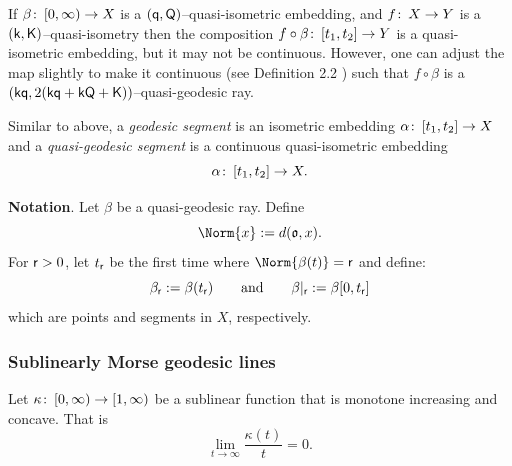 \documentclass[12 pt]{amsart}
\newcommand{\bfa}{\textbf{a}}
\newcommand{\bfb}{\textbf{b}}
\newcommand{\gothic}{\mathfrak}
\newcommand{\go}{{\gothic o}}
\theoremstyle{definition}
\theoremstyle{remark}
\newcommand{\sK}{{\sf K}}
\newcommand{\sQ}{{\sf Q}}
\renewcommand{\bfa}{{\sf a}}
\newcommand{\kk}{{\sf k}}
\newcommand{\qq}{{\sf q}}
\newcommand{\rr}{{\sf r}}
\newcommand{\from}{\colon\thinspace}
\begin{document}
If $\beta \from [0,\infty) \to X$ is a $(\qq, \sQ)$--quasi-isometric embedding, 
and $f \from X \to Y$ is a $(\kk, \sK)$--quasi-isometry then the composition 
$f \circ \beta \from [t_{1}, t_{2}] \to Y$ is a quasi-isometric embedding, but it may 
not be continuous. However, one can adjust the map slightly to make it continuous 
(see Definition 2.2  \cite{QRT1}) such that $f \circ \beta$ is a $(\kk\qq, 2(\kk\qq + \kk \sQ + \sK))$--quasi-geodesic ray.  

Similar to above, a \emph{geodesic segment} is an isometric embedding 
$\alpha \from [t_{1}, t_{2}] \to X$ and a \emph{quasi-geodesic segment} is a continuous 
quasi-isometric embedding \[\alpha \from [t_{1}, t_{2}] \to X.\] 

\noindent \textbf{Notation}. 
Let $\beta$ be a quasi-geodesic ray. Define 
\[
\Norm{x} : = d(\go, x).
\]
For $\rr>0$, let $t_\rr$ be the first time where $\Norm{\beta(t)}=\rr$ and define:
\begin{equation}\label{notation}
\beta_\rr := \beta(t_\rr)
\qquad\text{and}\qquad
\beta|_{\rr} : = \beta{[0,t_\rr]} 
\end{equation}
which are points and segments in $X$, respectively. 

\subsubsection{Sublinearly Morse geodesic lines} \hfill




Let $\kappa \from [0, \infty) \to [1, \infty)$ be a sublinear function that is monotone increasing and concave. That is
\[
\lim_{t \to \infty} \frac{\kappa(t)}{t} = 0. \label{subfunction}
\]
\end{document}
